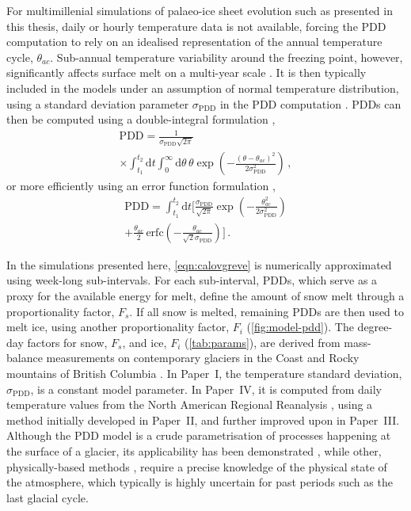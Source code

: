 \documentclass[a4paper]{kappa}
\newcommand{\PDD}[0]{\mathrm{PDD}}
\newcommand{\sPDD}[0]{\sigma_{\mathrm{PDD}}}
\newcommand{\CCLI}[0]{Paper~I}      %
\newcommand{\PSDV}[0]{Paper~II}     %
\newcommand{\PSDP}[0]{Paper~III}    %
\newcommand{\CCYC}[0]{Paper~IV}     %
\begin{document}
For multimillenial simulations of palaeo-ice sheet evolution such as
presented in this thesis, daily or hourly temperature data is not available,
forcing the PDD computation to rely on an idealised representation of the
annual temperature cycle, $\theta_{ac}$. Sub-annual temperature variability around
the freezing point, however, significantly affects surface melt on a multi-year
scale \citep{Arnold.Mackay.1964}. It is then typically included in the models
under an assumption of normal temperature distribution, using a standard
deviation parameter $\sPDD$ in the PDD computation \citep{Braithwaite.1984}.
PDDs can then be computed using a double-integral formulation
\citep{Reeh.1991},
\begin{multline}
    \PDD = \frac{1}{\sPDD\sqrt{2\pi}} \\
        \times
        \int_{t_1}^{t_2} \mathrm{d}t
        \int_{0}^{\infty} \mathrm{d}\theta \,
        \theta \exp\left({-\frac{(\theta-\theta_{ac})^2}{2\sPDD^2}}\right) \,,
\end{multline}
or more efficiently using an error function formulation
\citep{Calov.Greve.2005},
\begin{multline}
    \label{eqn:calovgreve}
    \PDD = \int_{t_1}^{t_2} \mathrm{d}t
        \bigg[\frac{\sPDD}{\sqrt{2\pi}}
                \exp\left({-\frac{\theta_{ac}^2}{2\sPDD^2}}\right) \\
              + \frac{\theta_{ac}}{2} \, \mathrm{erfc}
                \left(-\frac{\theta_{ac}}{\sqrt{2}\sPDD}\right)\bigg] \,.
\end{multline}

In the simulations presented here, \cref{eqn:calovgreve} is numerically
approximated using week-long sub-intervals. For each sub-interval, PDDs, which
serve as a proxy for the available energy for melt, define the amount of snow
melt through a proportionality factor, $F_s$. If all snow is melted, remaining
PDDs are then used to melt ice, using another proportionality factor, $F_i$
(\cref{fig:model-pdd}). The degree-day factors for snow, $F_s$, and ice, $F_i$
(\cref{tab:params}),
are derived from mass-balance measurements on contemporary glaciers in the
Coast and Rocky mountains of British Columbia \citep{Shea.etal.2009}. In
{\CCLI}, the temperature standard deviation, $\sPDD$, is a constant model
parameter. In {\CCYC}, it is computed from daily temperature values from the
North American Regional Reanalysis \citep[NARR,][]{Mesinger.etal.2006}, using
a method initially developed in {\PSDV}, and further improved upon in {\PSDP}.
Although the PDD model is a crude parametrisation of processes happening at the
surface of a glacier, its applicability has been demonstrated
\citep[e.g.][]{Hock.2003},
while other, physically-based methods \citep[e.g.][]{Hock.2005}, require a
precise knowledge of the physical state of the atmosphere, which typically is highly
uncertain for past periods such as the last glacial cycle.
\end{document}
